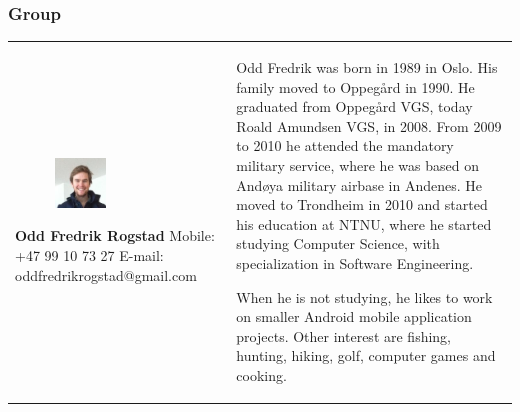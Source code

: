 \documentclass[11pt]{book}
\begin{document}
\subsubsection{Group}
\begin{table}[H]
\centering
\begin{tabular}{ p{7cm} p{7cm} }
\parbox{7cm}{
\begin{figure}[H]
      \includegraphics[width=0.4\textwidth]{Figures/oddRogstad.jpg}
      \label{fig:partners_group_odd}
\end{figure}
\textbf{Odd Fredrik Rogstad}\\
Mobile: +47 99 10 73 27\\
E-mail: oddfredrikrogstad@gmail.com} & \parbox{7cm}{
Odd Fredrik was born in 1989 in Oslo. His family moved to Oppegård in 1990. He graduated from Oppegård VGS, today Roald Amundsen VGS, in 2008. From 2009 to 2010 he attended the mandatory military service, where he was based on Andøya military airbase in Andenes. He moved to Trondheim in 2010 and started his education at NTNU, where he started studying Computer Science, with specialization in Software Engineering. 

When he is not studying, he likes to work on smaller Android mobile application projects. Other interest are fishing, hunting, hiking, golf, computer games and cooking.
}
\end{tabular}
\label{tab:partners_group_odd}
\end{table}
\end{document}
